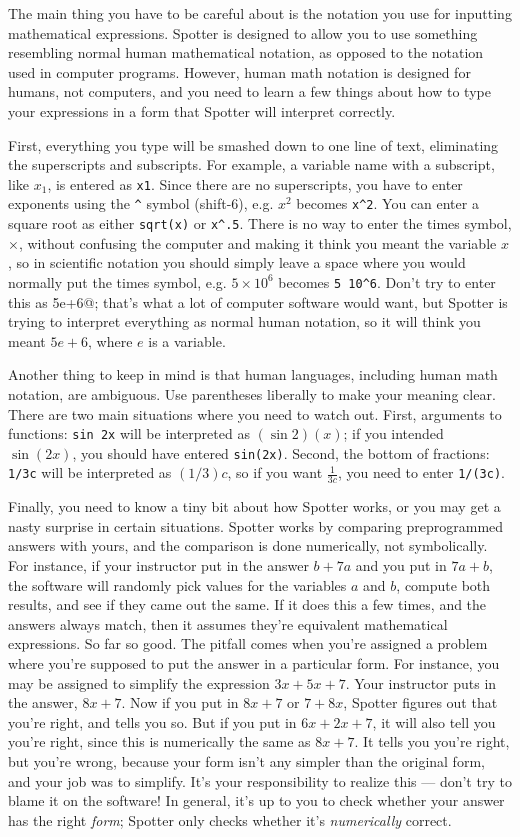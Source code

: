 \documentclass{doc}
\begin{document}
The main thing you have to be careful about is the notation you
use for inputting mathematical expressions. Spotter is designed
to allow you to use something resembling normal human mathematical
notation, as opposed to the notation used in computer programs.
However, human math notation is designed for humans, not computers,
and you need to learn a few things about how to type your expressions
in a form that Spotter will interpret correctly.

First, everything you type will be smashed down to one line of
text, eliminating the superscripts and subscripts. For example,
a variable name
with a subscript, like $x_1$, is entered as \verb+x1+. Since
there are no superscripts, you have to enter exponents
using the \verb+^+ symbol (shift-6), e.g. $x^2$ becomes \verb+x^2+.
You can enter a square root as either \verb+sqrt(x)+ or \verb+x^.5+.
There is no way to enter the times symbol, $\times$, without confusing
the computer and making it think you meant the variable $x$, so
in scientific notation you should simply leave a space where you
would normally put the times symbol, e.g. $5\times10^6$ becomes
\verb+5 10^6+. Don't try to enter this as \verb@5e+6@; that's what
a lot of computer software would want, but Spotter is trying to
interpret everything as normal human notation, so it will think
you meant $5e+6$, where $e$ is a variable.

Another thing to keep in mind is that human languages, including
human math notation, are ambiguous. Use parentheses liberally to
make your meaning clear. There are two main situations where you
need to watch out. First, arguments to functions:
 \verb+sin 2x+ will be interpreted as
$(\sin 2)(x)$; if you intended $\sin(2x)$, you should have entered
\verb+sin(2x)+. Second, the bottom of fractions: \verb+1/3c+ will
be interpreted as $(1/3)c$, so if you want $\frac{1}{3c}$, you
need to enter \verb+1/(3c)+.

Finally, you need to know a tiny bit about how Spotter works, or
you may get a nasty surprise in certain situations.
Spotter works by comparing preprogrammed answers
with yours, and the comparison is done numerically, not symbolically.
For instance, if your instructor put in the answer $b+7a$ and
you put in $7a+b$, the software will randomly pick values
for the variables $a$ and $b$, compute both results, and see if
they came out the same. If it does this a few times, and the answers
always match, then it assumes they're equivalent
mathematical expressions. So far so good. 
The pitfall comes when
you're assigned a problem where you're supposed to put the answer
in a particular form. For instance, you may be assigned to
simplify the expression $3x+5x+7$. 
Your instructor puts in the
answer, $8x+7$. Now if you put in $8x+7$ or
$7+8x$, Spotter figures out that you're right, and tells
you so. But if you put in $6x+2x+7$, it will also tell you you're
right, since this is numerically the same as $8x+7$. It tells you you're
right, but you're wrong, because your form isn't any simpler than
the original form, and your job was to simplify.
It's your responsibility to realize this ---
don't try to blame it on the software! In general, it's up to you
to check whether your answer has the right \emph{form}; Spotter
only checks whether it's \emph{numerically} correct.
\end{document}
